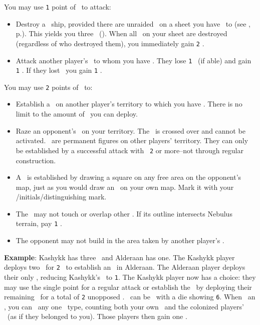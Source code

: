 You may use \texttt{1} point of \power\ to attack:
\begin{itemize}
  \item Destroy a \pirate\ ship, provided there are unraided \pirates\ on a 
        sheet you have \reach\ to (see , 
        p.\pageref{sec:reach}).  This yields you three \currency\ 
        (\gaincurrency\gaincurrency\gaincurrency).  When all \pirates\ on your 
        sheet are destroyed (regardless of who destroyed them), you immediately 
        gain \texttt{2} \happiness.
  \item Attack another player's \planet\ to whom you have \reach.  They lose 
        \texttt{1} \currency\ (if able) and gain \texttt{1} \unhappiness. If 
        they lost \currency\, you gain \texttt{1} \currency.
\end{itemize}
You may use \texttt{2} points of \power\ to:
\begin{itemize}
  \item Establish a \battleship\ on another player's territory to which you have
        \reach.  There is no limit to the amount of \battleships\ you can 
        deploy.
  \item Raze an opponent's \battleship\ on your territory.  The \battleship\ is 
        crossed over and cannot be activated.  \battleships\ are permanent 
        figures on other players' territory.  They can only be established by a 
        successful attack with \power\ \texttt{2} or more--not through regular 
        construction.
  \item A \battleship\ is established by drawing a square on any free area on 
        the opponent's map, just as you would draw an \armament\ on your own 
        map.  Mark it with your \insignia/initials/distinguishing mark.
  \item The \battleship\ may not touch or overlap other \armaments.  If its 
        outline intersects Nebulus terrain, pay \texttt{1} \currency.
  \item The opponent may not build in the area taken by another player's 
        \battleship.
\end{itemize}
\textbf{Example}: Kashykk has three \squadrons\ and Alderaan has one.  
The Kashykk player deploys two \squadrons\ for \texttt{2} \power\ to establish 
an \battleship\ in Alderaan.  The Alderaan player deploys their only \squadron, 
reducing Kashykk's \power\ to \texttt{1}.  The Kashykk player now has a choice: 
they may use the single point for a regular attack or establish the \battleship\
by deploying their remaining \squadron\ for a total of \texttt{2} unopposed 
\power.
\newline\newline
\battleships\ can be \activated\ with a die showing \texttt{6}. When 
\activating\ an \battleship, you can \activate\ any one \armament\ type, 
counting both your own \armament\ and the colonized players' \armaments\ (as if 
they belonged to you).  Those players then gain one \unhappiness.
